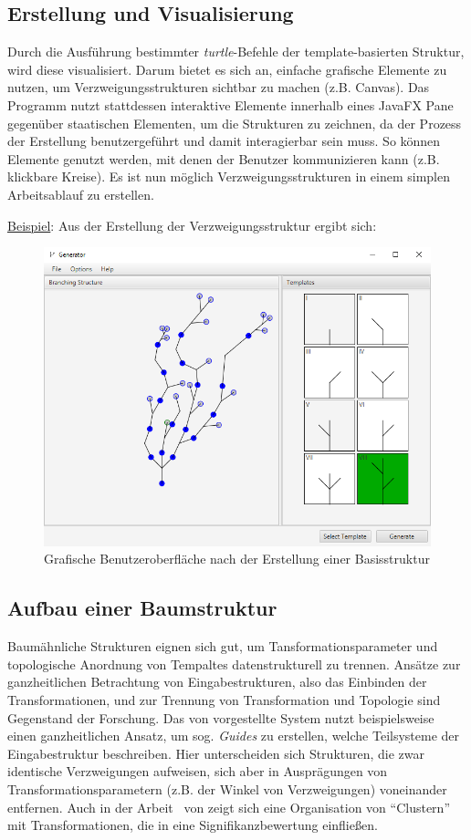 \subsection*{Erstellung und Visualisierung}
Durch die Ausführung bestimmter \textit{turtle}-Befehle der template-basierten Struktur, wird diese visualisiert.
Darum bietet es sich an, einfache grafische Elemente zu nutzen, um Verzweigungsstrukturen sichtbar zu machen
(z.B. Canvas).
Das Programm nutzt stattdessen interaktive Elemente innerhalb eines JavaFX Pane gegenüber staatischen Elementen, um
die Strukturen zu zeichnen, da der Prozess der Erstellung benutzergeführt und damit interagierbar sein muss.
So können Elemente genutzt werden, mit denen der Benutzer kommunizieren kann (z.B. klickbare Kreise).
Es ist nun möglich Verzweigungsstrukturen in einem simplen Arbeitsablauf zu erstellen.

\newpage

\underline{Beispiel}: Aus der Erstellung der Verzweigungsstruktur ergibt sich:
\begin{figure}[H]
    \centering
    \includegraphics[width=12cm]{../images/evaluierung_inferrieren.png}
    \caption{Grafische Benutzeroberfläche nach der Erstellung einer Basisstruktur}
\end{figure}

\subsection*{Aufbau einer Baumstruktur}
Baumähnliche Strukturen eignen sich gut, um Tansformationsparameter und topologische Anordnung von Tempaltes
datenstrukturell zu trennen.
Ansätze zur ganzheitlichen Betrachtung von Eingabestrukturen, also das Einbinden der Transformationen,
und zur Trennung von Transformation und Topologie sind Gegenstand der Forschung.
Das von \citeauthor{benes_2011} vorgestellte System nutzt beispielsweise einen ganzheitlichen Ansatz, um sog.
\textit{Guides} zu erstellen, welche Teilsysteme der Eingabestruktur beschreiben.
Hier unterscheiden sich Strukturen, die zwar identische Verzweigungen aufweisen, sich aber in Ausprägungen
von Transformationsparametern (z.B. der Winkel von Verzweigungen) voneinander entfernen.
Auch in der Arbeit~\cite{stava_2010} von \citeauthor{stava_2010} zeigt sich eine Organisation von
"`Clustern"' mit Transformationen, die in eine Signifikanzbewertung einfließen.

